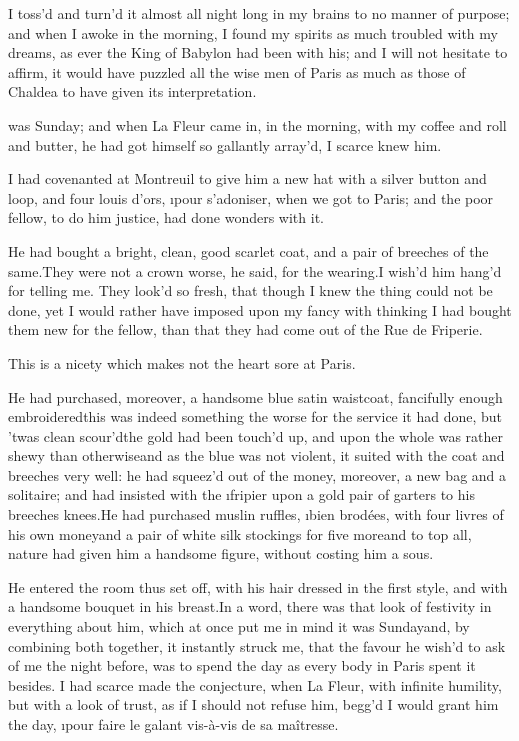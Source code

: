 \documentclass[twoside]{article}
\begin{document}
I toss’d and turn’d it almost all night
long in my brains to no manner of purpose;
and when I awoke in the morning, I found
my spirits as much troubled with my
dreams, as ever the King of Babylon had
been with his; and I will not hesitate to
affirm, it would have puzzled all the wise
men of Paris as much as those of Chaldea
to have given its interpretation.





\vskip 6pt


 was Sunday; and when La
Fleur came in, in the morning, with my
coffee and roll and butter, he had got
himself so gallantly array’d, I scarce
knew him.

I had covenanted at Montreuil to give him
a new hat with a silver button and loop,
and four louis d’ors, \i{pour s’adoniser},
when we got to Paris; and the poor fellow,
to do him justice, had done wonders with
it.

He had bought a bright, clean, good
scarlet coat, and a pair of breeches of
the same.\tskk They were not a crown
worse, he said, for the wearing.\tskk I
wish’d him hang’d for telling me.\tskk
They look’d so fresh, that though I knew
the thing could not be done, yet I would
rather have imposed upon my fancy with
thinking I had bought them new for the
fellow, than that they had come out of the
Rue de Friperie.

This is a nicety which makes not the heart
sore at Paris.

He had purchased, moreover, a handsome
blue satin waistcoat, fancifully enough
embroidered\tskk this was indeed
something the worse for the service it had
done, but ’twas clean scour’d\tskk the
gold had been touch’d up, and upon the
whole was rather shewy than
otherwise\tskk and as the blue was not
violent, it suited with the coat and
breeches very well: he had squeez’d out of
the money, moreover, a new bag and a
solitaire; and had insisted with the
\i{fripier} upon a gold pair of garters to
his breeches knees.\tskk He had purchased
muslin ruffles, \i{bien brodées}, with
four livres of his own money\tskk and a
pair of white silk stockings for five
more\tskk and to top all, nature had
given him a handsome figure, without
costing him a sous.

He entered the room thus set off, with his
hair dressed in the first style, and with
a handsome bouquet in his breast.\tskk In
a word, there was that look of festivity
in everything about him, which at once put
me in mind it was Sunday\tskk and, by
combining both together, it instantly
struck me, that the favour he wish’d to
ask of me the night before, was to spend
the day as every body in Paris spent it
besides.  I had scarce made the
conjecture, when La Fleur, with infinite
humility, but with a look of trust, as if
I should not refuse him, begg’d I would
grant him the day, \i{pour faire le galant
vis-à-vis de sa maîtresse}.
\end{document}

